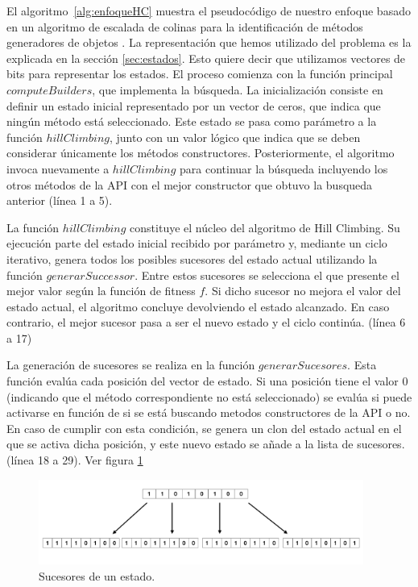 El algoritmo~\ref{alg:enfoqueHC} muestra el pseudocódigo de nuestro enfoque basado en un algoritmo de escalada de colinas para la identificación de métodos generadores de objetos . 
La representación que hemos utilizado del problema es la explicada en la sección
\ref{sec:estados}. Esto quiere decir que utilizamos vectores de bits para
representar los estados. 
El proceso comienza con la función principal $computeBuilders$, que implementa
la búsqueda. 
La inicialización consiste en definir un estado inicial representado por un vector de ceros, 
que indica que ningún método está seleccionado. Este estado se pasa como parámetro a la función $hillClimbing$, junto con un valor lógico que indica que se deben considerar únicamente los métodos constructores. 
Posteriormente, el algoritmo invoca nuevamente a $hillClimbing$ para continuar la búsqueda incluyendo los otros métodos de la API con el mejor constructor que obtuvo
la busqueda anterior (línea 1 a 5).

La función $hillClimbing$ constituye el núcleo del algoritmo de Hill Climbing. Su ejecución parte del estado inicial recibido por parámetro y, 
mediante un ciclo iterativo, genera todos los posibles sucesores del estado actual utilizando la función $generarSuccessor$. 
Entre estos sucesores se selecciona el que presente el mejor valor según la función de fitness $f$. Si dicho sucesor no mejora el valor del estado actual,
el algoritmo concluye devolviendo el estado alcanzado. En caso contrario, el mejor sucesor pasa a ser el nuevo estado y el ciclo continúa. (línea 6 a 17)

La generación de sucesores se realiza en la función $generarSucesores$. Esta función evalúa cada posición del vector de estado. Si una posición tiene el valor 0 
(indicando que el método correspondiente no está seleccionado) se evalúa si puede activarse en función de si se está buscando metodos constructores de la API o no. 
En caso de cumplir con esta condición, se genera un clon del estado actual en el que se activa dicha posición, y este nuevo estado se añade a la lista de sucesores. (línea 18 a 29). Ver figura \ref{fig:succ-hillClimbing}

\begin{figure}[H]
    \centering
    \includegraphics[width=0.95\textwidth]{images/succesores.png}
    \caption{Sucesores de un estado.}
    \label{fig:succ-hillClimbing}
  \end{figure}
  
